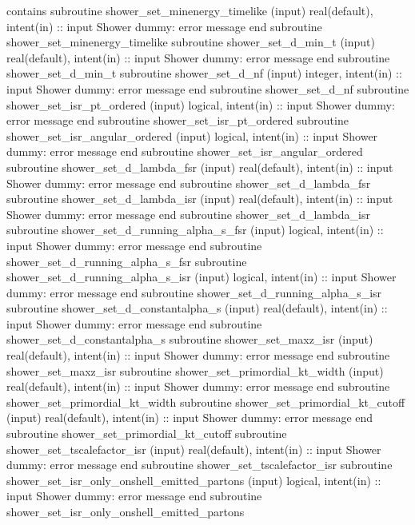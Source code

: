 contains
  subroutine shower_set_minenergy_timelike (input)
    real(default), intent(in) :: input
    \LA{}Shower dummy: error message\RA{}
  end subroutine shower_set_minenergy_timelike
  subroutine shower_set_d_min_t (input)
    real(default), intent(in) :: input
    \LA{}Shower dummy: error message\RA{}
  end subroutine shower_set_d_min_t
  subroutine shower_set_d_nf (input)
    integer, intent(in) :: input
    \LA{}Shower dummy: error message\RA{}
  end subroutine shower_set_d_nf
  subroutine shower_set_isr_pt_ordered (input)
    logical, intent(in) :: input
    \LA{}Shower dummy: error message\RA{}
  end subroutine shower_set_isr_pt_ordered
  subroutine shower_set_isr_angular_ordered (input)
    logical, intent(in) :: input
    \LA{}Shower dummy: error message\RA{}
  end subroutine shower_set_isr_angular_ordered
  subroutine shower_set_d_lambda_fsr (input)
    real(default), intent(in) :: input
    \LA{}Shower dummy: error message\RA{}
  end subroutine shower_set_d_lambda_fsr
  subroutine shower_set_d_lambda_isr (input)
    real(default), intent(in) :: input
    \LA{}Shower dummy: error message\RA{}
  end subroutine shower_set_d_lambda_isr
  subroutine shower_set_d_running_alpha_s_fsr (input)
    logical, intent(in) :: input
    \LA{}Shower dummy: error message\RA{}
  end subroutine shower_set_d_running_alpha_s_fsr
  subroutine shower_set_d_running_alpha_s_isr (input)
    logical, intent(in) :: input
    \LA{}Shower dummy: error message\RA{}
  end subroutine shower_set_d_running_alpha_s_isr
  subroutine shower_set_d_constantalpha_s (input)
    real(default), intent(in) :: input
    \LA{}Shower dummy: error message\RA{}
  end subroutine shower_set_d_constantalpha_s
  subroutine shower_set_maxz_isr (input)
    real(default), intent(in) :: input
    \LA{}Shower dummy: error message\RA{}
  end subroutine shower_set_maxz_isr
  subroutine shower_set_primordial_kt_width (input)
    real(default), intent(in) :: input
    \LA{}Shower dummy: error message\RA{}
  end subroutine shower_set_primordial_kt_width
  subroutine shower_set_primordial_kt_cutoff (input)
    real(default), intent(in) :: input
    \LA{}Shower dummy: error message\RA{}
  end subroutine shower_set_primordial_kt_cutoff
  subroutine shower_set_tscalefactor_isr (input)
    real(default), intent(in) :: input
    \LA{}Shower dummy: error message\RA{}
  end subroutine shower_set_tscalefactor_isr
  subroutine shower_set_isr_only_onshell_emitted_partons (input)
    logical, intent(in) :: input
    \LA{}Shower dummy: error message\RA{}
  end subroutine shower_set_isr_only_onshell_emitted_partons

